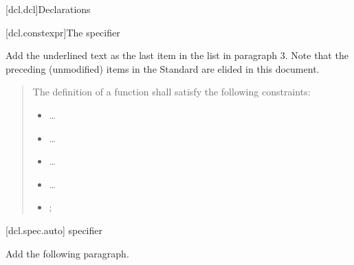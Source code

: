 
\setcounter{chapter}{6}
[dcl.dcl]{Declarations}

\setcounter{section}{1}
\setcounter{subsection}{4}
[dcl.constexpr]{The  specifier}%

Add the underlined text as the last item in the list in paragraph 3. Note that
the preceding (unmodified) items in the \Cpp Standard are elided in this
document.

\begin{quote}
  \setcounter{Paras}{2}
\pnum
{}
The definition of a  function shall satisfy the following
constraints:

\begin{itemize}
  \item \ldots
  \item \ldots
  \item \ldots
  \item \ldots
  \item {};
\end{itemize}
\end{quote}

%
%  
%      

\setcounter{section}{1}
\setcounter{subsection}{6}
\setcounter{subsubsection}{3}
[dcl.spec.auto]{ specifier}

Add the following paragraph.

